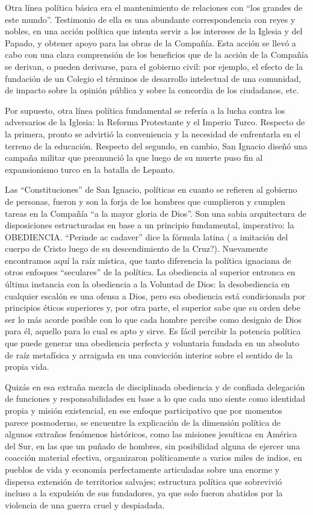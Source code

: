 \documentclass[
]{book}
\begin{document}
Otra línea política básica era el mantenimiento de relaciones con ``los grandes de este mundo''. Testimonio de ella es una abundante correspondencia con reyes y nobles, en una acción política que intenta servir a los intereses de la Iglesia y del Papado, y obtener apoyo para las obras de la Compañía. Esta acción se llevó a cabo con una clara comprensión de los beneficios que de la acción de la Compañía se derivan, o pueden derivarse, para el gobierno civil: por ejemplo, el efecto de la fundación de un Colegio el términos de desarrollo intelectual de una comunidad, de impacto sobre la opinión pública y sobre la concordia de los ciudadanos, etc.

Por supuesto, otra línea política fundamental se refería a la lucha contra los adversarios de la Iglesia: la Reforma Protestante y el Imperio Turco. Respecto de la primera, pronto se advirtió la conveniencia y la necesidad de enfrentarla en el terreno de la educación. Respecto del segundo, en cambio, San Ignacio diseñó una campaña militar que preanunció la que luego de su muerte puso fin al expansionismo turco en la batalla de Lepanto.

Las ``Constituciones'' de San Ignacio, políticas en cuanto se refieren al gobierno de personas, fueron y son la forja de los hombres que cumplieron y cumplen tareas en la Compañía ``a la mayor gloria de Dios''. Son una sabia arquitectura de disposiciones estructuradas en base a un principio fundamental, imperativo: la OBEDIENCIA. ``Perinde ac cadaver'' dice la fórmula latina ( a imitación del cuerpo de Cristo luego de su descendimiento de la Cruz?). Nuevamente encontramos aquí la raíz mística, que tanto diferencia la política ignaciana de otros enfoques ``seculares'' de la política. La obediencia al superior entronca en última instancia con la obediencia a la Voluntad de Dios: la desobediencia en cualquier escalón es una ofensa a Dios, pero esa obediencia está condicionada por principios éticos superiores y, por otra parte, el superior sabe que su orden debe ser lo más acorde posible con lo que cada hombre percibe como designio de Dios para él, aquello para lo cual es apto y sirve. Es fácil percibir la potencia política que puede generar una obediencia perfecta y voluntaria fundada en un absoluto de raíz metafísica y arraigada en una convicción interior sobre el sentido de la propia vida.

Quizás en esa extraña mezcla de disciplinada obediencia y de confiada delegación de funciones y responsabilidades en base a lo que cada uno siente como identidad propia y misión existencial, en ese enfoque participativo que por momentos parece posmoderno, se encuentre la explicación de la dimensión política de algunos extraños fenómenos históricos, como las misiones jesuíticas en América del Sur, en las que un puñado de hombres, sin posibilidad alguna de ejercer una coacción material efectiva, organizaron políticamente a varios miles de indios, en pueblos de vida y economía perfectamente articuladas sobre una enorme y dispersa extensión de territorios salvajes; estructura política que sobrevivió incluso a la expulsión de sus fundadores, ya que solo fueron abatidos por la violencia de una guerra cruel y despiadada.
\end{document}

